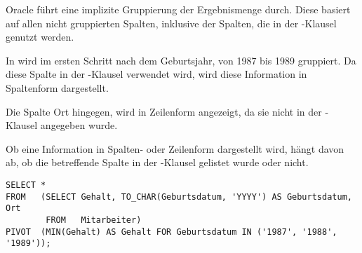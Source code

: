           \begin{merke}
            Oracle führt eine implizite Gruppierung der Ergebnismenge durch. Diese basiert auf allen nicht gruppierten Spalten, inklusive der Spalten, die in der -Klausel genutzt werden.
          \end{merke}
          In  wird im ersten Schritt nach dem Geburtsjahr, von 1987 bis 1989 gruppiert. Da diese Spalte in der -Klausel verwendet wird, wird diese Information in Spaltenform dargestellt.

          Die Spalte Ort hingegen, wird in Zeilenform angezeigt, da sie nicht in der -Klausel angegeben wurde.

          \begin{merke}
            Ob eine Information in Spalten- oder Zeilenform dargestellt wird, hängt davon ab, ob die betreffende Spalte in der -Klausel gelistet wurde oder nicht.
          \end{merke}
          \begin{lstlisting}[language=oracle_sql,caption={Zusätzliche Gruppierungen in einer Pivot-Abfrage},label=sql06_21]
SELECT *
FROM   (SELECT Gehalt, TO_CHAR(Geburtsdatum, 'YYYY') AS Geburtsdatum, Ort
        FROM   Mitarbeiter)
PIVOT  (MIN(Gehalt) AS Gehalt FOR Geburtsdatum IN ('1987', '1988', '1989'));
          \end{lstlisting}
\clearpage
